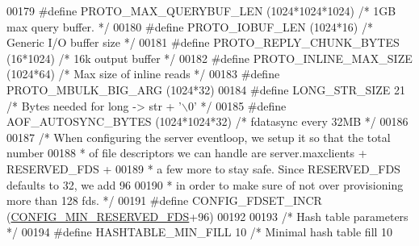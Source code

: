 \begin{DoxyCode}
{{{{{00179 \textcolor{preprocessor}{#}\textcolor{preprocessor}{define} \textcolor{preprocessor}{PROTO\_MAX\_QUERYBUF\_LEN}  \textcolor{preprocessor}{(}1024\textcolor{preprocessor}{*}1024\textcolor{preprocessor}{*}1024\textcolor{preprocessor}{)} \textcolor{comment}{/* 1GB max query buffer. */}
00180 \textcolor{preprocessor}{#}\textcolor{preprocessor}{define} \textcolor{preprocessor}{PROTO\_IOBUF\_LEN}         \textcolor{preprocessor}{(}1024\textcolor{preprocessor}{*}16\textcolor{preprocessor}{)}  \textcolor{comment}{/* Generic I/O buffer size */}
00181 \textcolor{preprocessor}{#}\textcolor{preprocessor}{define} \textcolor{preprocessor}{PROTO\_REPLY\_CHUNK\_BYTES} \textcolor{preprocessor}{(}16\textcolor{preprocessor}{*}1024\textcolor{preprocessor}{)} \textcolor{comment}{/* 16k output buffer */}
00182 \textcolor{preprocessor}{#}\textcolor{preprocessor}{define} \textcolor{preprocessor}{PROTO\_INLINE\_MAX\_SIZE}   \textcolor{preprocessor}{(}1024\textcolor{preprocessor}{*}64\textcolor{preprocessor}{)} \textcolor{comment}{/* Max size of inline reads */}
00183 \textcolor{preprocessor}{#}\textcolor{preprocessor}{define} \textcolor{preprocessor}{PROTO\_MBULK\_BIG\_ARG}     \textcolor{preprocessor}{(}1024\textcolor{preprocessor}{*}32\textcolor{preprocessor}{)}
00184 \textcolor{preprocessor}{#}\textcolor{preprocessor}{define} \textcolor{preprocessor}{LONG\_STR\_SIZE}      21          \textcolor{comment}{/* Bytes needed for long -> str + '\(\backslash\)0' */}
00185 \textcolor{preprocessor}{#}\textcolor{preprocessor}{define} \textcolor{preprocessor}{AOF\_AUTOSYNC\_BYTES} \textcolor{preprocessor}{(}1024\textcolor{preprocessor}{*}1024\textcolor{preprocessor}{*}32\textcolor{preprocessor}{)} \textcolor{comment}{/* fdatasync every 32MB */}
00186 
00187 \textcolor{comment}{/* When configuring the server eventloop, we setup it so that the total number}
00188 \textcolor{comment}{ * of file descriptors we can handle are server.maxclients + RESERVED\_FDS +}
00189 \textcolor{comment}{ * a few more to stay safe. Since RESERVED\_FDS defaults to 32, we add 96}
00190 \textcolor{comment}{ * in order to make sure of not over provisioning more than 128 fds. */}
00191 \textcolor{preprocessor}{#}\textcolor{preprocessor}{define} \textcolor{preprocessor}{CONFIG\_FDSET\_INCR} \textcolor{preprocessor}{(}\hyperlink{server_8h_abcea50457e3de849eab11d0ba5d81d08}{CONFIG\_MIN\_RESERVED\_FDS}\textcolor{preprocessor}{+}96\textcolor{preprocessor}{)}
00192 
00193 \textcolor{comment}{/* Hash table parameters */}
00194 \textcolor{preprocessor}{#}\textcolor{preprocessor}{define} \textcolor{preprocessor}{HASHTABLE\_MIN\_FILL}        10      \textcolor{comment}{/* Minimal hash table fill 10%
}}}}}}
\end{DoxyCode}
